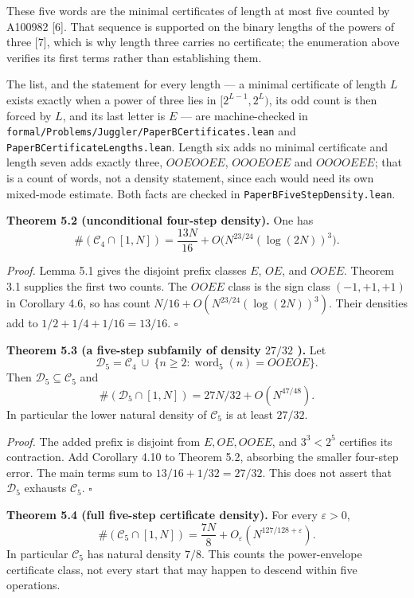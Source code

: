 \documentclass[11pt,a4paper]{article}
\begin{document}
These five words are the minimal certificates of length at most five
counted by A100982 {[}6{]}. That sequence is supported on the binary
lengths of the powers of three {[}7{]}, which is why length three
carries no certificate; the enumeration above verifies its first terms
rather than establishing them.

The list, and the statement for every length --- a minimal certificate
of length \(L\) exists exactly when a power of three lies in
\([2^{L-1},2^{L})\), its odd count is then forced by \(L\), and its last
letter is \(E\) --- are machine-checked in
\texttt{formal/Problems/Juggler/PaperBCertificates.lean} and
\texttt{PaperBCertificateLengths.lean}. Length six adds no minimal
certificate and length seven adds exactly three, \(OOEOOEE\),
\(OOOEOEE\) and \(OOOOEEE\); that is a count of words, not a density
statement, since each would need its own mixed-mode estimate. Both facts
are checked in \texttt{PaperBFiveStepDensity.lean}.


\textbf{Theorem 5.2 (unconditional four-step density).} One has \[
\#(\mathcal C_4\cap[1,N])
=\frac{13N}{16}+O\bigl(N^{23/24}(\log(2N))^3\bigr).
\]

\emph{Proof.} Lemma 5.1 gives the disjoint prefix classes \(E\), \(OE\),
and \(OOEE\). Theorem 3.1 supplies the first two counts. The \(OOEE\)
class is the sign class \((-1,+1,+1)\) in Corollary 4.6, so has count
\(N/16+O(N^{23/24}(\log(2N))^3)\). Their densities add to
\(1/2+1/4+1/16=13/16\). \(\square\)


\textbf{Theorem 5.3 (a five-step subfamily of density \(27/32\) ).} Let
\[
\mathcal D_5=\mathcal C_4\ \cup\
\{n\ge2:\operatorname{word}_5(n)=OOEOE\}.
\] Then \(\mathcal D_5\subseteq\mathcal C_5\) and \[
\#(\mathcal D_5\cap[1,N])=27N/32+O(N^{47/48}).
\] In particular the lower natural density of \(\mathcal C_5\) is at
least \(27/32\).

\emph{Proof.} The added prefix is disjoint from \(E,OE,OOEE\), and
\(3^3<2^5\) certifies its contraction. Add Corollary 4.10 to Theorem
5.2, absorbing the smaller four-step error. The main terms sum to
\(13/16+1/32=27/32\). This does not assert that \(\mathcal D_5\)
exhausts \(\mathcal C_5\). \(\square\)


\textbf{Theorem 5.4 (full five-step certificate density).} For every
\(\varepsilon>0\), \[
\#(\mathcal C_5\cap[1,N])
=\frac{7N}{8}+O_\varepsilon(N^{127/128+\varepsilon}).
\] In particular \(\mathcal C_5\) has natural density \(7/8\). This
counts the power-envelope certificate class, not every start that may
happen to descend within five operations.
\end{document}
